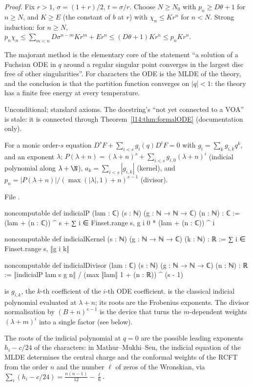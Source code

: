 \noindent\emph{Proof.} Fix $r>1$, $\sigma = (1+r)/2$, $t = \sigma/r$. Choose $N\ge N_0$ with $p_n\ge D\theta+1$ for $n\ge N$, and
$K\ge E$ (the constant of $b$ at $r$) with $\chi_n\le Kr^n$ for $n<N$. Strong induction: for $n\ge N$,
$p_n\chi_n\le\sum_{m<n}D\sigma^{n-m}Kr^m + Er^n\le(D\theta+1)Kr^n\le p_nKr^n$.
\begin{physics}
The majorant method is the elementary core of the statement ``a solution of a Fuchsian ODE in $q$ around a regular singular
point converges in the largest disc free of other singularities''. For characters the ODE is the MLDE of the theory, and the
conclusion is that the partition function converges on $|q|<1$: the theory has a finite free energy at every temperature.
\end{physics}
\begin{status}
Unconditional; standard axioms. The docstring's ``not yet connected to a VOA'' is stale: it is connected through
Theorem~\ref{l14:thm:formalODE} (documentation only).
\end{status}

\begin{definition}\label{l14:def:indicial}
For a monic order-$s$ equation $D^sF + \sum_{i<s}g_i(q)D^iF = 0$ with $g_i = \sum_kg_{i,k}q^k$, and an exponent $\lambda$:
$P(\lambda+n) = (\lambda+n)^s + \sum_{i<s}g_{i,0}(\lambda+n)^i$ (indicial polynomial along $\lambda+\N$),
$a_k = \sum_{i<s}|g_{i,k}|$ (kernel), and $p_n = |P(\lambda+n)|/(\max(|\lambda|,1)+n)^{s-1}$ (divisor).
\end{definition}
\noindent File .
\begin{leancode}
noncomputable def indicialP (lam : ℂ) (s : ℕ) (g : ℕ → ℕ → ℂ) (n : ℕ) : ℂ :=
  (lam + (n : ℂ)) ^ s + ∑ i ∈ Finset.range s, g i 0 * (lam + (n : ℂ)) ^ i

noncomputable def indicialKernel (s : ℕ) (g : ℕ → ℕ → ℂ) (k : ℕ) : ℝ :=
  ∑ i ∈ Finset.range s, ‖g i k‖

noncomputable def indicialDivisor (lam : ℂ) (s : ℕ) (g : ℕ → ℕ → ℂ) (n : ℕ) : ℝ :=
  ‖indicialP lam s g n‖ / (max ‖lam‖ 1 + (n : ℝ)) ^ (s - 1)
\end{leancode}
\begin{dictionary}
 is $g_{i,k}$, the $k$-th coefficient of the $i$-th ODE coefficient.  is the classical indicial
polynomial evaluated at $\lambda+n$; its roots are the Frobenius exponents. The divisor normalisation by $(B+n)^{s-1}$ is the
device that turns the $m$-dependent weights $(\lambda+m)^i$ into a single factor (see below).
\end{dictionary}
\begin{physics}
The roots of the indicial polynomial at $q=0$ are the possible leading exponents $h_i - c/24$ of the characters: in
Mathur--Mukhi--Sen, the indicial equation of the MLDE determines the central charge and the conformal weights of the RCFT
from the order $n$ and the number $\ell$ of zeros of the Wronskian, via $\sum_i(h_i - c/24) = \frac{n(n-1)}{12} - \frac\ell6$.
\end{physics}

